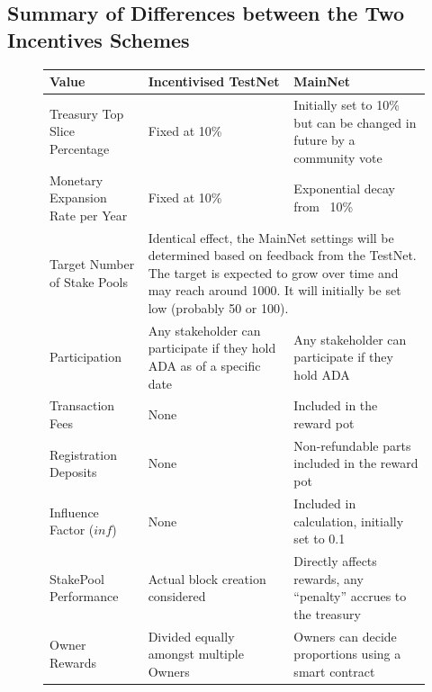 \documentclass[11pt,a4paper,dvipsnames,twosided,final]{article}
\begin{document}
\clearpage
\subsection{Summary of Differences between the Two Incentives Schemes}
\label{sec:summary}

\begin{figure}[h!]
\begin{center}
\begin{tabular}{||l|p{4cm}|p{4cm}||}
  \hline\hline
  \textbf{Value} & \textbf{Incentivised TestNet} & \textbf{MainNet}
                                              \\\hline
Treasury Top Slice Percentage
& Fixed at 10\%
& Initially set to 10\% but can be changed in future by a community vote
                                              \\\hline
Monetary Expansion Rate per Year
& Fixed at 10\%
& Exponential decay from ~10\%
                                              \\\hline
 Target Number of Stake Pools
                 &
\multicolumn{2}{|p{8cm}||}{
Identical effect, the MainNet settings will be determined based on feedback from the TestNet.
The target is expected to grow over time and may reach around 1000.
It will initially be set low (probably 50 or 100).}
                                              \\\hline
Participation
& Any stakeholder can participate if they hold ADA as of a specific date
& Any stakeholder can participate if they hold ADA
                                              \\\hline
Transaction Fees
& None
& Included in the reward pot
                                              \\\hline
Registration Deposits
& None
& Non-refundable parts included in the reward pot
                                              \\\hline
Influence Factor ($\textit{inf}$)
& None
& Included in calculation, initially set to 0.1
                                              \\\hline
StakePool Performance
& Actual block creation considered
& Directly affects rewards, any ``penalty'' accrues to the treasury
                                              \\\hline
Owner Rewards
& Divided equally amongst multiple Owners
& Owners can decide proportions using a smart contract
                                              \\\hline

\end{tabular}
\end{center}
\end{figure}
\end{document}
